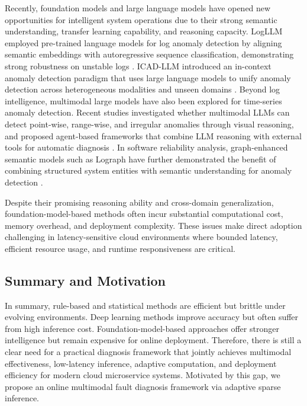 Recently, foundation models and large language models have opened new opportunities for intelligent system operations due to their strong semantic understanding, transfer learning capability, and reasoning capacity. LogLLM employed pre-trained language models for log anomaly detection by aligning semantic embeddings with autoregressive sequence classification, demonstrating strong robustness on unstable logs \cite{guan2024logllm}. ICAD-LLM introduced an in-context anomaly detection paradigm that uses large language models to unify anomaly detection across heterogeneous modalities and unseen domains \cite{wu2026icad}. Beyond log intelligence, multimodal large models have also been explored for time-series anomaly detection. Recent studies investigated whether multimodal LLMs can detect point-wise, range-wise, and irregular anomalies through visual reasoning, and proposed agent-based frameworks that combine LLM reasoning with external tools for automatic diagnosis \cite{xu2026can}. In software reliability analysis, graph-enhanced semantic models such as Lograph have further demonstrated the benefit of combining structured system entities with semantic understanding for anomaly detection \cite{10839428}.

Despite their promising reasoning ability and cross-domain generalization, foundation-model-based methods often incur substantial computational cost, memory overhead, and deployment complexity. These issues make direct adoption challenging in latency-sensitive cloud environments where bounded latency, efficient resource usage, and runtime responsiveness are critical.

\subsection{Summary and Motivation}

In summary, rule-based and statistical methods are efficient but brittle under evolving environments. Deep learning methods improve accuracy but often suffer from high inference cost. Foundation-model-based approaches offer stronger intelligence but remain expensive for online deployment. Therefore, there is still a clear need for a practical diagnosis framework that jointly achieves multimodal effectiveness, low-latency inference, adaptive computation, and deployment efficiency for modern cloud microservice systems. Motivated by this gap, we propose an online multimodal fault diagnosis framework via adaptive sparse inference.

